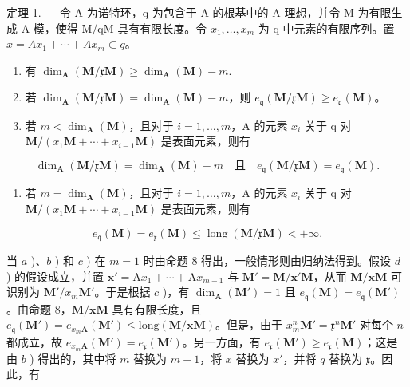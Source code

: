 定理 1. --- 令 A 为诺特环，q 为包含于 A 的根基中的 A-理想，并令 M 为有限生成 A-模，使得 M/qM 具有有限长度。令 \(x_{1}, \ldots, x_{m}\) 为 q 中元素的有限序列。置 \(x = Ax_{1} + \cdots + Ax_{m} \subset q\)。

\begin{enumerate}
\def\labelenumi{\alph{enumi})}
\item
  有 \(\dim_{\mathbf{A}}(\mathbf{M} / \mathfrak{x}\mathbf{M})\geqslant \dim_{\mathbf{A}}(\mathbf{M}) - m.\)
\item
  若 \(\dim_{\mathbf{A}}(\mathbf{M} / \mathfrak{x}\mathbf{M}) = \dim_{\mathbf{A}}(\mathbf{M}) - m\)，则 \(e_{\mathfrak{q}}(\mathbf{M} / \mathfrak{x}\mathbf{M}) \geqslant e_{\mathfrak{q}}(\mathbf{M})\)。
\item
  若 \(m < \dim_{\mathbf{A}}(\mathbf{M})\)，且对于 \(i = 1, \ldots, m\)，A 的元素 \(x_{i}\) 关于 q 对 \(\mathbf{M}/(x_{1}\mathbf{M} + \cdots + x_{i-1}\mathbf{M})\) 是表面元素，则有
\end{enumerate}

\[
\dim_{\mathbf{A}}(\mathbf{M} / \mathfrak{x}\mathbf{M}) = \dim_{\mathbf{A}}(\mathbf{M}) - m \quad\text{且}\quad e_{\mathfrak{q}}(\mathbf{M} / \mathfrak{x}\mathbf{M}) = e_{\mathfrak{q}}(\mathbf{M}).
\]

\begin{enumerate}
\def\labelenumi{\alph{enumi})}
\setcounter{enumi}{3}
\tightlist
\item
  若 \(m = \dim_{\mathbf{A}}(\mathbf{M})\)，且对于 \(i = 1, \ldots, m\)，A 的元素 \(x_{i}\) 关于 q 对 \(\mathbf{M}/(x_{1}\mathbf{M} + \cdots + x_{i-1}\mathbf{M})\) 是表面元素，则有
\end{enumerate}

\[
e _ {\mathfrak {q}} (\mathbf {M}) = e _ {\mathfrak {x}} (\mathbf {M}) \leqslant \operatorname{long} (\mathbf {M} / \mathfrak{x}\mathbf{M}) <   + \infty .
\]

当 \(a\) )、\(b\) ) 和 \(c\) ) 在 \(m = 1\) 时由命题 8 得出，一般情形则由归纳法得到。假设 \(d\) ) 的假设成立，并置 \(\mathbf{x}' = \mathrm{A}x_{1} + \cdots + \mathrm{A}x_{m-1}\) 与 \(\mathbf{M}' = \mathbf{M}/\mathbf{x}'\mathbf{M}\)，从而 \(\mathbf{M}/\mathbf{x}\mathbf{M}\) 可识别为 \(\mathbf{M}'/x_{m}\mathbf{M}'\)。于是根据 \(c\) )，有 \(\dim_{\mathbf{A}}(\mathbf{M}') = 1\) 且 \(e_{\mathfrak{q}}(\mathbf{M}) = e_{\mathfrak{q}}(\mathbf{M}')\)。由命题 8，\(\mathbf{M}/\mathbf{x}\mathbf{M}\) 具有有限长度，且 \(e_{\mathfrak{q}}(\mathbf{M}') = e_{x_{m}\mathbf{A}}(\mathbf{M}') \leqslant \text{long}(\mathbf{M}/\mathbf{x}\mathbf{M})\)。但是，由于 \(x_{m}^{n}\mathbf{M}' = \mathfrak{x}^{n}\mathbf{M}'\) 对每个 \(n\) 都成立，故 \(e_{x_{m}\mathbf{A}}(\mathbf{M}') = e_{\mathfrak{x}}(\mathbf{M}')\)。另一方面，有 \(e_{\mathfrak{x}}(\mathbf{M}') \geqslant e_{\mathfrak{x}}(\mathbf{M})\)；这是由 \(b\) ) 得出的，其中将 \(m\) 替换为 \(m - 1\)，将 \(x\) 替换为 \(x'\)，并将 \(q\) 替换为 \(\mathfrak{x}\)。因此，有

